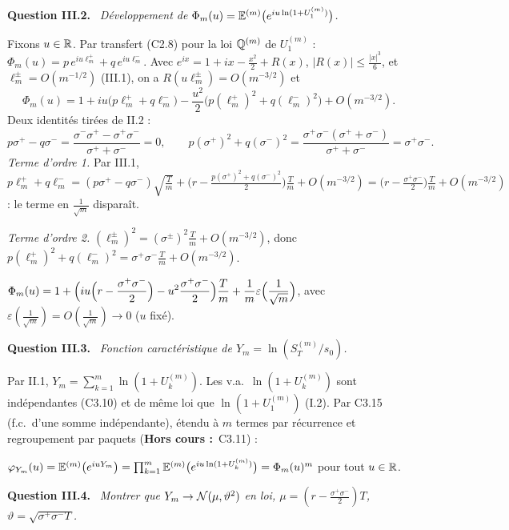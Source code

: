 \documentclass[11pt,a4paper]{article}
\newcommand{\question}[1]{\par\medskip\noindent\textbf{Question #1.}~}
\newcommand{\hc}{\textbf{Hors cours :}~}
\newcommand{\Em}{\E^{(m)}}
\begin{document}
\begin{exo}
\question{III.2} \emph{Développement de $\Phi_m(u)=\Em\bigl(e^{iu\ln(1+U^{(m)}_1)}\bigr)$.}

Fixons $u\in\mathbb{R}$. Par transfert (C2.8) pour la loi $\mathbb{Q}^{(m)}$ de $U^{(m)}_1$ : $\Phi_m(u)=p\,e^{iu\ell^+_m}+q\,e^{iu\ell^-_m}$. Avec
$e^{ix}=1+ix-\frac{x^2}2+R(x)$, $|R(x)|\le\frac{|x|^3}6$, et $\ell^\pm_m=O(m^{-1/2})$ (III.1), on a $R(u\ell^\pm_m)=O(m^{-3/2})$ et
\[\Phi_m(u)=1+iu\bigl(p\ell^+_m+q\ell^-_m\bigr)-\frac{u^2}2\bigl(p(\ell^+_m)^2+q(\ell^-_m)^2\bigr)+O(m^{-3/2}).\]
Deux identités tirées de II.2 :
\[p\sigma^+-q\sigma^-=\frac{\sigma^-\sigma^+-\sigma^+\sigma^-}{\sigma^++\sigma^-}=0,\qquad
p(\sigma^+)^2+q(\sigma^-)^2=\frac{\sigma^+\sigma^-(\sigma^++\sigma^-)}{\sigma^++\sigma^-}=\sigma^+\sigma^- .\]
\emph{Terme d'ordre 1.} Par III.1, $p\ell^+_m+q\ell^-_m=(p\sigma^+-q\sigma^-)\sqrt{\frac Tm}+\bigl(r-\frac{p(\sigma^+)^2+q(\sigma^-)^2}2\bigr)\frac Tm+O(m^{-3/2})
=\bigl(r-\frac{\sigma^+\sigma^-}2\bigr)\frac Tm+O(m^{-3/2})$ : le terme en $\frac1{\sqrt m}$ disparaît.

\emph{Terme d'ordre 2.} $(\ell^\pm_m)^2=(\sigma^\pm)^2\frac Tm+O(m^{-3/2})$, donc $p(\ell^+_m)^2+q(\ell^-_m)^2=\sigma^+\sigma^-\frac Tm+O(m^{-3/2})$.
\begin{resultat}
$\displaystyle\Phi_m(u)=1+\Bigl(iu\Bigl(r-\frac{\sigma^+\sigma^-}2\Bigr)-u^2\frac{\sigma^+\sigma^-}2\Bigr)\frac Tm+\frac1m\varepsilon\Bigl(\frac1{\sqrt m}\Bigr)$,
avec $\varepsilon(\frac1{\sqrt m})=O(\frac1{\sqrt m})\to0$ ($u$ fixé).
\end{resultat}

\question{III.3} \emph{Fonction caractéristique de $Y_m=\ln(S^{(m)}_T/s_0)$.}

Par II.1, $Y_m=\sum_{k=1}^m\ln(1+U^{(m)}_k)$. Les v.a.\ $\ln(1+U^{(m)}_k)$ sont indépendantes (C3.10) et de même loi que $\ln(1+U^{(m)}_1)$
(I.2). Par C3.15 (f.c.\ d'une somme indépendante), étendu à $m$ termes par récurrence et regroupement par paquets (\hc C3.11) :
\begin{resultat}
$\varphi_{Y_m}(u)=\Em\bigl(e^{iuY_m}\bigr)=\prod_{k=1}^m\Em\bigl(e^{iu\ln(1+U^{(m)}_k)}\bigr)=\Phi_m(u)^m$ pour tout $u\in\mathbb{R}$.
\end{resultat}

\question{III.4} \emph{Montrer que $Y_m\to\mathcal{N}(\mu,\vartheta^2)$ en loi, $\mu=(r-\frac{\sigma^+\sigma^-}2)T$, $\vartheta=\sqrt{\sigma^+\sigma^-T}$.}


\end{exo}
\end{document}
